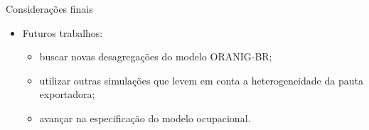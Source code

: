 \documentclass[10pt]{sintefbeamer}
\begin{document}
\begin{frame}{Considerações finais}
	\begin{itemize}
		\item Futuros trabalhos:
		\begin{itemize}[<+->]
			\item buscar novas desagregações do modelo ORANIG-BR;
			\item utilizar outras simulações que levem em conta a heterogeneidade da pauta exportadora;
			\item avançar na especificação do modelo ocupacional.
		\end{itemize}
	\end{itemize}
\end{frame}



\bibliographpage



\backmatter
\end{document}
